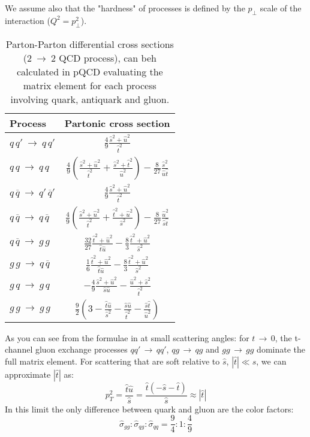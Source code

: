 We assume also that the "hardness" of processes is defined by the $p_\perp$ scale of the interaction ($Q^2=p_\perp^2$).

\begin{table}[!ht]
	\centering
	\begin{tabular}{l | c}\rule{0pt}{3ex} 
	Process & Partonic cross section \rule{0pt}{3.5ex}\\   \hline\hline 
	$q\,q'\ \rightarrow\ q\,q'$ & $\frac{4}{9}\frac{\hat{s}^2+\hat{u}^2}{\hat{t}^2}$\rule{0pt}{3.5ex}\\
	$q\,q\ \rightarrow\ q\,q$ & $\frac{4}{9}\left(\frac{\hat{s}^2+\hat{u}^2}{\hat{t}^2}+\frac{\hat{s}^2+\hat{t}^2}{\hat{u}^2}\right) -\frac{8}{27}\frac{\hat{s}^2}{\hat{u}\hat{t}}$\rule{0pt}{3.5ex}\\
	$q\,\overline{q}\ \rightarrow\ q'\,\overline{q}'$ & $\frac{4}{9}\frac{\hat{s}^2+\hat{u}^2}{\hat{t}^2}$\rule{0pt}{3.5ex}\\
	$q\,\overline{q}\ \rightarrow\ q\,\overline{q}$ & $\frac{4}{9}\left(\frac{\hat{s}^2+\hat{u}^2}{\hat{t}^2}+\frac{\hat{t}^2+\hat{u}^2}{\hat{s}^2}\right) -\frac{8}{27}\frac{\hat{u}^2}{\hat{s}\hat{t}}$\rule{0pt}{3.5ex}\\
	$q\,\overline{q}\ \rightarrow\ g\,g$ & $\frac{32}{27}\frac{\hat{t}^2+\hat{u}^2}{\hat{t}\hat{u}}-\frac{8}{3}\frac{\hat{t}^2+\hat{u}^2}{\hat{s}^2}$\rule{0pt}{3.5ex}\\
	$g\,g\ \rightarrow\ q\,\overline{q}$ & $\frac{1}{6}\frac{\hat{t}^2+\hat{u}^2}{\hat{t}\hat{u}}-\frac{8}{3}\frac{\hat{t}^2+\hat{u}^2}{\hat{s}^2}$\rule{0pt}{3.5ex}\\
	$g\,q\ \rightarrow\ g\,q$ & $-\frac{4}{9}\frac{\hat{s}^2+\hat{u}^2}{\hat{s}\hat{u}}-\frac{\hat{u}^2+\hat{s}^2}{\hat{t}^2}$\rule{0pt}{3.5ex}\\
	$g\,g\ \rightarrow\ g\,g$ & $\frac{9}{2}\left( 3-\frac{\hat{t}\hat{u}}{\hat{s}^2} -\frac{\hat{s}\hat{u}}{\hat{t}^2} - \frac{\hat{s}\hat{t}}{\hat{u}^2} \right)$\rule{0pt}{3.5ex}
	\end{tabular}
	\caption{Parton-Parton differential cross sections ($2\ \rightarrow\ 2$ QCD process), can beh calculated in pQCD evaluating the matrix element for each process involving quark, antiquark and gluon.}
	\label{table:partonic_cross_sections}
\end{table}

As you can see from the formulae in 
at small scattering angles: for $t\,\rightarrow\,0$,  the t-channel gluon exchange processes $qq'\,\rightarrow\,qq'$, $qg\,\rightarrow\,qg$ and $gg\,\rightarrow\,gg$ dominate the full matrix element. For scattering that are soft relative to $\hat{s}$, $|\hat{t}|\ll \hat{s}$, we can approximate $|\hat{t}|$ as:
\begin{equation}
	p_T^2=\frac{\hat{t}\hat{u}}{\hat{s}} = \frac{\hat{t}(-\hat{s}-\hat{t})}{\hat{s}} \approx |\hat{t}|
\end{equation}
In this limit the only difference between quark and gluon are the color factors:
\begin{equation}
	\hat{\sigma}_{gg}:\hat{\sigma}_{qg}:\hat{\sigma}_{qq}=\frac{9}{4}:1:\frac{4}{9}
\end{equation}

